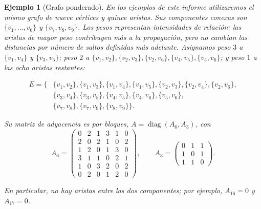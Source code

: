 \documentclass[a4paper,openany,oneside,10pt]{report}
\theoremstyle{pnlTeorema}
\theoremstyle{pnlDefinicion}
\theoremstyle{pnlObservacion}
\newtheorem{ejemplo}{Ejemplo}[section]
\begin{document}
\begin{ejemplo}[Grafo ponderado]\label{ej:grafo-ponderado}
En los ejemplos de este informe utilizaremos el mismo grafo de nueve vértices y quince aristas. Sus componentes conexas son \(\{v_1,\ldots,v_6\}\) y \(\{v_7,v_8,v_9\}\). Los pesos representan intensidades de relación: las aristas de mayor peso contribuyen más a la propagación, pero no cambian las distancias por número de saltos definidas más adelante. Asignamos peso \(3\) a \(\{v_1,v_4\}\) y \(\{v_3,v_5\}\); peso \(2\) a \(\{v_1,v_2\},\{v_2,v_3\},\{v_2,v_6\},\{v_4,v_5\},\{v_5,v_6\}\); y peso \(1\) a las ocho aristas restantes:

\[
\begin{aligned}
E=\{&\{v_1,v_2\},\{v_1,v_3\},\{v_1,v_4\},\{v_1,v_5\},\{v_2,v_3\},\{v_2,v_4\},\{v_2,v_6\},\\
&\{v_3,v_4\},\{v_3,v_5\},\{v_4,v_5\},\{v_4,v_6\},\{v_5,v_6\},\\
&\{v_7,v_8\},\{v_7,v_9\},\{v_8,v_9\}\}.
\end{aligned}
\]

Su matriz de adyacencia es por bloques, \(A=\operatorname{diag}(A_6,A_3)\), con
\[
A_6=\begin{pmatrix}0&2&1&3&1&0\\2&0&2&1&0&2\\1&2&0&1&3&0\\3&1&1&0&2&1\\1&0&3&2&0&2\\0&2&0&1&2&0\end{pmatrix},\qquad
A_3=\begin{pmatrix}0&1&1\\1&0&1\\1&1&0\end{pmatrix}.
\]

En particular, no hay aristas entre las dos componentes; por ejemplo, \(A_{16}=0\) y \(A_{17}=0\).

\begin{center}
\par{}
\end{center}
\end{ejemplo}
\end{document}
